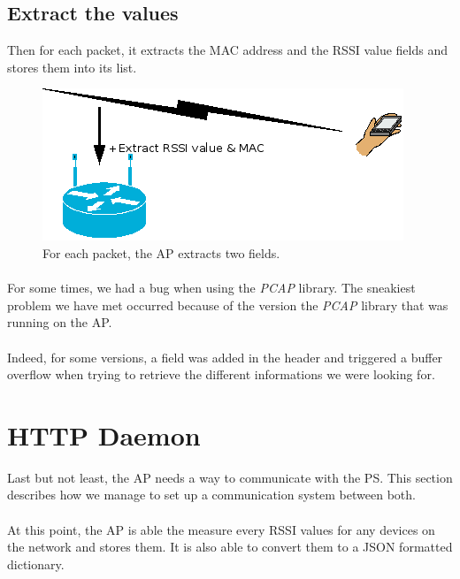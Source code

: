 \subsection{Extract the values}

Then for each packet, it extracts the MAC address and the RSSI value fields and
stores them into its list.

\begin{figure}[H]
  \centering
  \includegraphics[scale=.7]{./ap/focus_mobile_with_aps.png}
  \caption{For each packet, the AP extracts two fields.}
\end{figure}

\paragraph{}
For some times, we had a bug when using the \emph{PCAP} library. The sneakiest
problem we have met occurred because of the version the \emph{PCAP} library
that was running on the AP.

\paragraph{}
Indeed, for some versions, a field was added in the header and triggered a
buffer overflow when trying to retrieve the different informations we were
looking for.

\section{HTTP Daemon}

Last but not least, the AP needs a way to communicate with the PS. This section
describes how we manage to set up a communication system between both.

\paragraph{}
At this point, the AP is able the measure every RSSI values for any devices on
the network and stores them. It is also able to convert them to a JSON
formatted dictionary.

